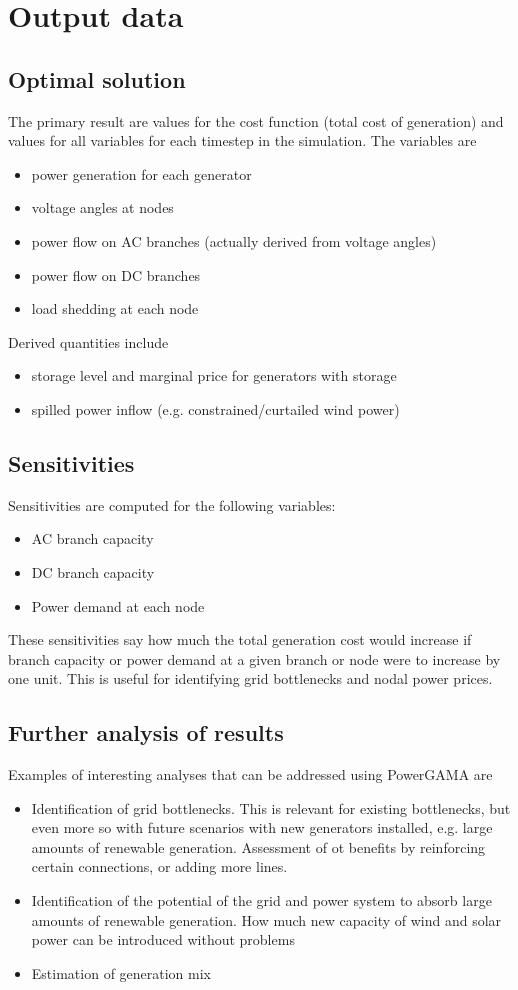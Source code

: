 \documentclass{article}
\begin{document}
\section{Output data}


\subsection{Optimal solution}
The primary result are values for the cost function (total cost of generation) and values for all variables for each timestep in the simulation. The variables are
\begin{itemize}
\item power generation for each generator
\item voltage angles at nodes
\item power flow on AC branches (actually derived from voltage angles)
\item power flow on DC branches 
\item load shedding at each node
\end{itemize}
Derived quantities include
\begin{itemize}
\item storage level and marginal price for generators with storage
\item spilled power inflow (e.g. constrained/curtailed wind power)
\end{itemize}


\subsection{Sensitivities}
Sensitivities are computed for the following variables:
\begin{itemize}
\item AC branch capacity
\item DC branch capacity
\item Power demand at each node
\end{itemize}
These sensitivities say how much the total generation cost would increase if branch capacity or power demand at a given branch or node were to increase by one unit. 
This is useful for identifying grid bottlenecks and nodal power prices.


\subsection{Further analysis of results}
Examples of interesting analyses that can be addressed using PowerGAMA are
\begin{itemize}
\item Identification of grid bottlenecks. This is relevant for existing bottlenecks, but even more so with future scenarios with new generators installed, e.g. large amounts of renewable generation. Assessment of ot benefits by reinforcing certain connections, or adding more lines.
\item Identification of the potential of the grid and power system to absorb large amounts of renewable generation. How much new capacity of wind and solar power can be introduced without problems
\item Estimation of generation mix 
\end{itemize}
\end{document}
